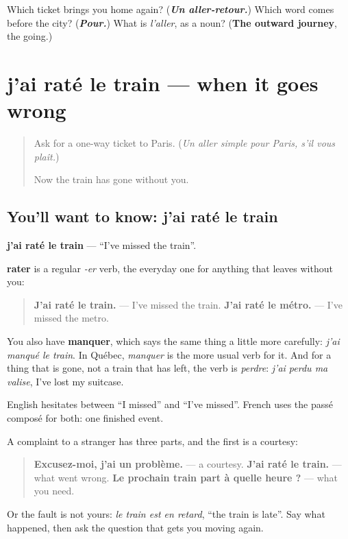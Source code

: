 \begin{tcolorbox}[breakable,colback=teal!4,colframe=teal!35!black,title={Before you move on}]
Which ticket brings you home again? (\emph{\textbf{Un aller-retour.}}) Which word comes before the city? (\emph{\textbf{Pour.}}) What is \emph{l'aller}, as a noun? (\textbf{The outward journey}, the going.)
\end{tcolorbox}
\section[j'ai raté le train]{j'ai raté le train — when it goes wrong}

\label{lesson:FR-C263-rate-le-train}



\begin{quote}
Ask for a one-way ticket to Paris. (\emph{Un aller simple pour Paris, s'il vous plaît.})

Now the train has gone without you.
\end{quote}

\subsection*{You'll want to know: j'ai raté le train}
\textbf{j'ai raté le train} — \textquotedblleft{}I've missed the train\textquotedblright{}.

\textbf{rater} is a regular \emph{-er} verb, the everyday one for anything that leaves without you:

\begin{quote}
\textbf{J'ai raté le train.} — I've missed the train. \textbf{J'ai raté le métro.} — I've missed the metro.
\end{quote}

You also have \textbf{manquer}, which says the same thing a little more carefully: \emph{j'ai manqué le train}. In Québec, \emph{manquer} is the more usual verb for it. And for a thing that is gone, not a train that has left, the verb is \emph{perdre}: \emph{j'ai perdu ma valise}, I've lost my suitcase.

English hesitates between \textquotedblleft{}I missed\textquotedblright{} and \textquotedblleft{}I've missed\textquotedblright{}. French uses the passé composé for both: one finished event.

\begin{grammarlens}[title={Grammar Lens: reporting a problem}]
A complaint to a stranger has three parts, and the first is a courtesy:

\begin{quote}
\textbf{Excusez-moi, j'ai un problème.} — a courtesy. \textbf{J'ai raté le train.} — what went wrong. \textbf{Le prochain train part à quelle heure ?} — what you need.
\end{quote}

Or the fault is not yours: \emph{le train est en retard}, \textquotedblleft{}the train is late\textquotedblright{}. Say what happened, then ask the question that gets you moving again.
\end{grammarlens}

